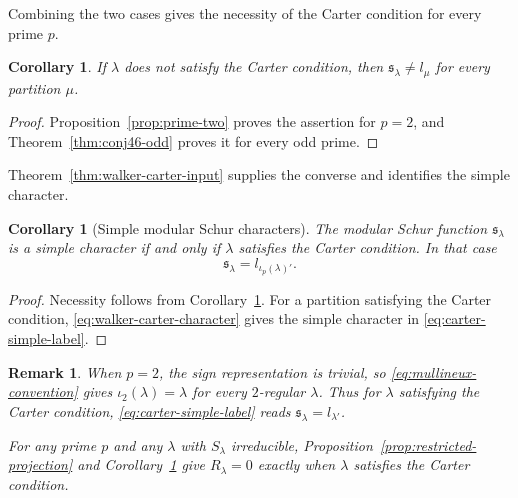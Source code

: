 \documentclass[12pt,reqno,a4paper]{amsart}
\numberwithin{equation}{section}
\numberwithin{figure}{section}
\theoremstyle{plain}
\newtheorem{corollary}[theorem]{Corollary}
\newtheorem{remark}[theorem]{Remark}
\theoremstyle{definition}
\begin{document}
Combining the two cases gives the necessity of the Carter condition
for every prime $p$.

\begin{corollary}
\label{cor:conj46}
If $\lambda$ does not satisfy the Carter condition, then $\mathfrak{s}_\lambda\neq l_\mu$ for every partition $\mu$.
\end{corollary}

\begin{proof}
Proposition~\ref{prop:prime-two} proves the assertion for $p=2$, and
Theorem~\ref{thm:conj46-odd} proves it for every odd prime.
\end{proof}

Theorem~\ref{thm:walker-carter-input} supplies the converse and
identifies the simple character.

\begin{corollary}[Simple modular Schur characters]
\label{cor:carter-classification}
The modular Schur function $\mathfrak{s}_\lambda$ is a simple
character if and only if $\lambda$ satisfies the Carter condition.
In that case
\begin{equation}\label{eq:carter-simple-label}
\mathfrak{s}_\lambda=l_{\iota_p(\lambda)'}.
\end{equation}
\end{corollary}

\begin{proof}
Necessity follows from Corollary~\ref{cor:conj46}.  For a partition
satisfying the Carter condition, \eqref{eq:walker-carter-character}
gives the simple character in \eqref{eq:carter-simple-label}.
\end{proof}

\begin{remark}
When $p=2$, the sign representation is trivial, so
\eqref{eq:mullineux-convention} gives $\iota_2(\lambda)=\lambda$
for every $2$-regular $\lambda$.  Thus for $\lambda$ satisfying the
Carter condition, \eqref{eq:carter-simple-label} reads
$\mathfrak{s}_\lambda=l_{\lambda'}$.

For any prime $p$ and any $\lambda$ with $S_\lambda$ irreducible,
Proposition~\ref{prop:restricted-projection} and
Corollary~\ref{cor:carter-classification} give $R_\lambda=0$ exactly
when $\lambda$ satisfies the Carter condition.
\end{remark}
\end{document}
